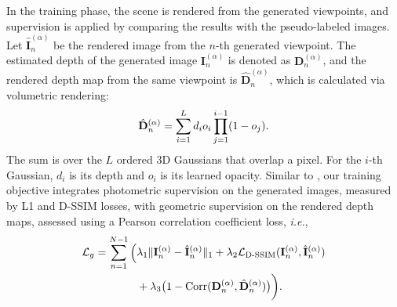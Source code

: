 In the training phase, the scene is rendered from the generated viewpoints, and supervision is applied by comparing the results with the pseudo-labeled images. Let $\hat{\mathbf{I}}_{n}^{(\alpha)}$ be the rendered image from the $n$-th generated viewpoint. The estimated depth of the generated image $\mathbf{I}_{n}^{(\alpha)}$ is denoted as $\mathbf{D}_{n}^{(\alpha)}$, and the rendered depth map from the same viewpoint is $\hat{\mathbf{D}}_{n}^{(\alpha)}$, which is calculated via volumetric rendering:
\begin{equation}
\small
\hat{\mathbf{D}}_{n}^{(\alpha)} = \sum_{i=1}^{L} d_i o_i \prod_{j=1}^{i-1}(1-o_j).
\end{equation}The sum is over the $L$ ordered 3D Gaussians that overlap a pixel. For the $i$-th Gaussian, ${d}_{i}$ is its depth and $o_{i}$ is its learned opacity.
Similar to \cite{zhu2024fsgs}, our training objective integrates photometric supervision on the generated images, measured by L1 and D-SSIM losses, with geometric supervision on the rendered depth maps, assessed using a Pearson correlation coefficient loss, \emph{i.e.},
\begin{align}
\footnotesize
    \mathcal{L}_g = \sum_{n=1}^{N-1} \bigg( & \lambda_1 \|\mathbf{I}_{n}^{(\alpha)} - \hat{\mathbf{I}}_{n}^{(\alpha)}\|_1 + \lambda_2 \mathcal{L}_{\text{D-SSIM}}(\mathbf{I}_{n}^{(\alpha)}, \hat{\mathbf{I}}_{n}^{(\alpha)}) \notag \\
    & + \lambda_3 \big(1 - \mathrm{Corr}(\mathbf{D}_{n}^{(\alpha)}, \hat{\mathbf{D}}_{n}^{(\alpha)})\big) \bigg).
\label{equa(3)}
\end{align}

